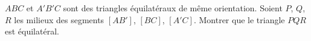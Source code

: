 $ABC$ et $A'B'C$ sont des triangles équilatéraux de même orientation. Soient $P$, $Q$, $R$ les milieux des segments $[AB']$, $[BC]$, $[A'C]$. Montrer que le triangle $PQR$ est équilatéral.
